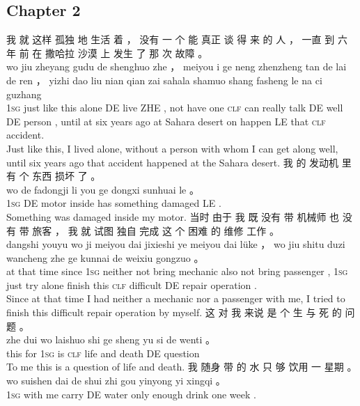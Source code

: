 \documentclass[UTF8]{ctexart}
\begin{document}
\subsection*{Chapter 2}
\begin{exe}
\ex
\glll
我 就 这样 孤独 地 生活 着 ， 没有 一 个 能 真正 谈 得 来 的 人 ， 一直 到 六 年 前 在 撒哈拉 沙漠 上 发生 了 那 次 故障 。
\\
wo jiu zheyang gudu de shenghuo zhe ， meiyou i ge neng zhenzheng tan de lai de ren ， yizhi dao liu nian qian zai sahala shamuo shang fasheng le na ci guzhang
\\
\textsc{1sg} just {like this} alone DE live ZHE , {not have} one \textsc{clf} can really talk DE {well} DE person , until at six years ago at Sahara desert on happen LE that \textsc{clf} accident. 
\\
\trans Just like this, I lived alone, without a person with whom I can get along well, until six years ago that accident happened at the Sahara desert. 
\ex
\glll
我 的 发动机 里 有 个 东西 损坏 了 。
\\
wo de fadongji li you ge dongxi sunhuai le 。
\\
\textsc{1sg} DE motor inside has something damaged LE .
\\
\trans Something was damaged inside my motor. 
\ex
\glll
当时 由于 我 既 没有 带 机械师 也 没有 带 旅客 ， 我 就 试图 独自 完成 这 个 困难 的 维修 工作 。
\\
dangshi youyu wo ji meiyou dai jixieshi ye meiyou dai l\"{u}ke ， wo jiu shitu duzi wancheng zhe ge kunnai de weixiu gongzuo 。
\\
{at that time} since \textsc{1sg} neither not bring mechanic also not bring passenger , \textsc{1sg} just try alone finish this \textsc{clf} difficult DE repair operation .
\\
\trans Since at that time I had neither a mechanic nor a passenger with me, I tried to finish this difficult repair operation by myself. 
\ex
\glll
这 对 我 来说 是 个 生 与 死 的 问题 。
\\
zhe dui wo laishuo shi ge sheng yu si de wenti 。
\\
this for \textsc{1sg} {} is \textsc{clf} life and death DE question
\\
\trans To me this is a question of life and death. 
\ex
\glll
我 随身 带 的 水 只 够 饮用 一 星期 。
\\
wo suishen dai de shui zhi gou yinyong yi xingqi 。
\\
\textsc{1sg} {with me} carry DE water only enough drink one week .

\end{exe}
\end{document}
